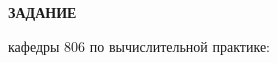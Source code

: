 \begin{center}
\bfseries{\large ЗАДАНИЕ}
\end{center}

кафедры 806 по вычислительной практике:

\pagebreak